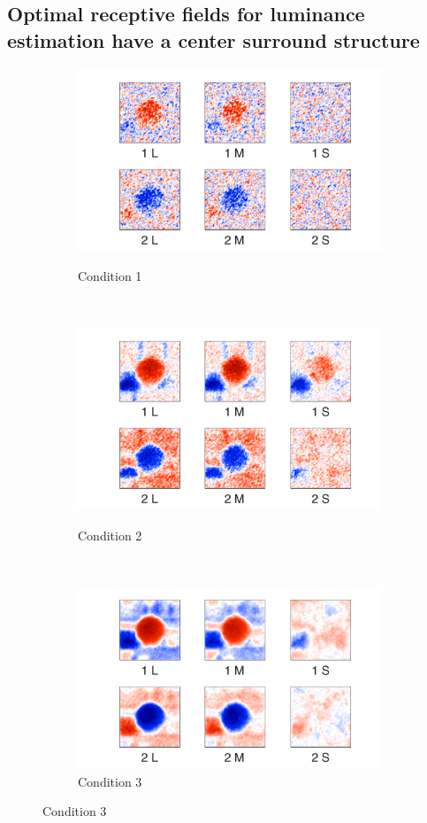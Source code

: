 \documentclass{jov}
\begin{document}
\subsection{Optimal receptive fields for luminance estimation have a center surround structure}
\begin{figure}
\centering
\begin{subfigure}{0.21 \textwidth}
	\caption{Condition 1}
	\includegraphics[width=\textwidth]{../FiguresDraft4/Figure14/Figure14_a.pdf}
	\label{fig:case1Filter}
    \end{subfigure}
    ~ ~ ~
    \begin{subfigure}{0.21 \textwidth}   
	\caption{Condition 2}
	\includegraphics[width=\textwidth]{../FiguresDraft4/Figure14/Figure14_b.pdf}
	\label{fig:case2Filter}
    \end{subfigure}
    ~ ~ ~
        \begin{subfigure}{0.21 \textwidth}
	\caption{Condition 3}
	\includegraphics[width=\textwidth]{../FiguresDraft4/Figure14/Figure14_c.pdf}

\end{subfigure}
\end{figure}
\end{document}
